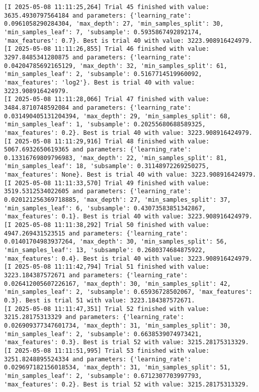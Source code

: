 \documentclass[
  letterpaper,
  DIV=11,
  numbers=noendperiod]{scrreprt}
\begin{document}
\begin{verbatim}
[I 2025-05-08 11:11:25,264] Trial 45 finished with value: 3635.4930797564184 and parameters: {'learning_rate': 0.0961058290284304, 'max_depth': 27, 'min_samples_split': 30, 'min_samples_leaf': 7, 'subsample': 0.5935867492892174, 'max_features': 0.7}. Best is trial 40 with value: 3223.908916424979.
[I 2025-05-08 11:11:26,855] Trial 46 finished with value: 3297.8485341280875 and parameters: {'learning_rate': 0.04204785692165129, 'max_depth': 32, 'min_samples_split': 61, 'min_samples_leaf': 2, 'subsample': 0.5167714519960092, 'max_features': 'log2'}. Best is trial 40 with value: 3223.908916424979.
[I 2025-05-08 11:11:28,066] Trial 47 finished with value: 3484.8710748592084 and parameters: {'learning_rate': 0.031490405131204394, 'max_depth': 29, 'min_samples_split': 68, 'min_samples_leaf': 1, 'subsample': 0.20255680688589325, 'max_features': 0.2}. Best is trial 40 with value: 3223.908916424979.
[I 2025-05-08 11:11:29,916] Trial 48 finished with value: 5067.6932650619365 and parameters: {'learning_rate': 0.13316769809796983, 'max_depth': 22, 'min_samples_split': 81, 'min_samples_leaf': 18, 'subsample': 0.31148972269250275, 'max_features': None}. Best is trial 40 with value: 3223.908916424979.
[I 2025-05-08 11:11:33,570] Trial 49 finished with value: 3519.5312534022605 and parameters: {'learning_rate': 0.020121256369718885, 'max_depth': 27, 'min_samples_split': 37, 'min_samples_leaf': 6, 'subsample': 0.43073583851342867, 'max_features': 0.1}. Best is trial 40 with value: 3223.908916424979.
[I 2025-05-08 11:11:38,292] Trial 50 finished with value: 4947.269431523515 and parameters: {'learning_rate': 0.01401704983937264, 'max_depth': 30, 'min_samples_split': 56, 'min_samples_leaf': 13, 'subsample': 0.2680374684875922, 'max_features': 0.4}. Best is trial 40 with value: 3223.908916424979.
[I 2025-05-08 11:11:42,794] Trial 51 finished with value: 3223.184387572671 and parameters: {'learning_rate': 0.026412005607226167, 'max_depth': 30, 'min_samples_split': 42, 'min_samples_leaf': 2, 'subsample': 0.65936728502067, 'max_features': 0.3}. Best is trial 51 with value: 3223.184387572671.
[I 2025-05-08 11:11:47,351] Trial 52 finished with value: 3215.28175313329 and parameters: {'learning_rate': 0.026909377347601734, 'max_depth': 31, 'min_samples_split': 30, 'min_samples_leaf': 2, 'subsample': 0.6638539074973421, 'max_features': 0.3}. Best is trial 52 with value: 3215.28175313329.
[I 2025-05-08 11:11:51,995] Trial 53 finished with value: 3251.8248895524334 and parameters: {'learning_rate': 0.029697182156018534, 'max_depth': 31, 'min_samples_split': 51, 'min_samples_leaf': 2, 'subsample': 0.6712307703997793, 'max_features': 0.2}. Best is trial 52 with value: 3215.28175313329.

\end{verbatim}
\end{document}
